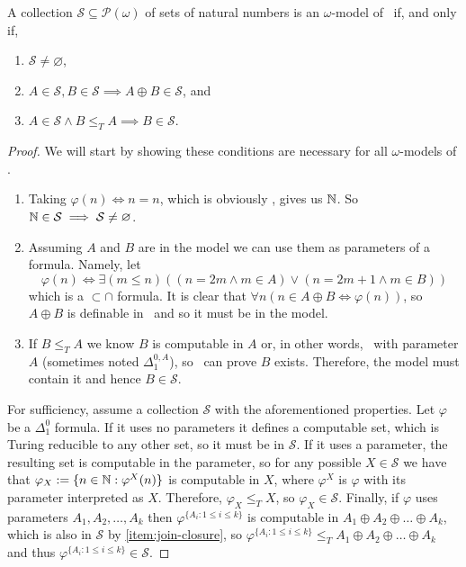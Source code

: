 \documentclass[../main.tex]{memoir}
\begin{document}
\begin{theorem}
  A collection $\mathcal{S} \subseteq \mathcal{P}(\omega)$ of sets of natural numbers is an $\omega$-model of \rca\ if, and only if,

  \begin{enumerate}[label=(\roman*), ref=(\roman*)]
  \item $\mathcal{S} \neq \varnothing$,
  \item \label{item:join-closure} $A \in \mathcal{S}, B \in \mathcal{S} \implies A \oplus B \in \mathcal{S}$, and
  \item $A \in \mathcal{S} \land B \le_T A \implies B \in \mathcal{S}$.
  \end{enumerate}
\end{theorem}
\begin{proof}
  We will start by showing these conditions are necessary for all $\omega$-models of \rca.

  \begin{enumerate}
  \item Taking $\varphi(n) \iff n = n$, which is obviously \rec, gives us $\mathbb{N}$. So $\mathbb{N} \in \mathcal{S} \implies \mathcal{S} \neq \varnothing$.
  \item Assuming $A$ and $B$ are in the model we can use them as parameters of a formula. Namely, let
    \[ \varphi(n) \iff \exists (m \le n) ((n = 2m \land m \in A) \lor (n = 2m + 1 \land m \in B)) \]
    which is a $ \subset $$ \cap $ formula. It is clear that $\forall n (n \in A \oplus B \iff \varphi(n))$, so $A \oplus B$ is definable in \rca\ and so it must be in the model.
  \item If $B \le_T A$ we know $B$ is computable in $A$ or, in other words, \rec\ with parameter $A$ (sometimes noted $\Delta_{1}^{0,A}$), so \rca\ can prove $B$ exists. Therefore, the model must contain it and hence $B \in \mathcal{S}$.
  \end{enumerate}

  For sufficiency, assume a collection $\mathcal{S}$ with the aforementioned properties. Let $\varphi$ be a $\Delta_{1}^{0}$ formula. If it uses no parameters it defines a computable set, which is Turing reducible to any other set, so it must be in $\mathcal{S}$. If it uses a parameter, the resulting set is computable in the parameter, so for any possible $X \in \mathcal{S}$ we have that $\varphi_X := \{n \in \mathbb{N}: \varphi^X(n)\}$ is computable in $X$, where $\varphi^X$ is $\varphi$ with its parameter interpreted as $X$. Therefore, $\varphi_X \le_T X$, so $\varphi_X \in \mathcal{S}$. Finally, if $\varphi$ uses parameters $A_1, A_2, \ldots, A_k$ then $\varphi^{\{A_i: 1 \le i \le k\}}$ is computable in $A_1 \oplus A_2 \oplus \ldots \oplus A_k$, which is also in $\mathcal{S}$ by \ref{item:join-closure}, so $\varphi^{\{A_i: 1 \le i \le k\}} \le_T A_1 \oplus A_2 \oplus \ldots \oplus A_k$ and thus $\varphi^{\{A_i: 1 \le i \le k\}} \in \mathcal{S}$.
\end{proof}
\end{document}
